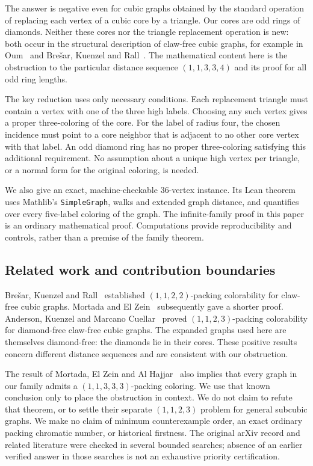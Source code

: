 \documentclass[11pt,a4paper]{article}
\theoremstyle{definition}
\theoremstyle{remark}
\newcommand{\palette}{(1,1,3,3,4)}
\newcommand{\weakpalette}{(1,1,3,3,3)}
\begin{document}
The answer is negative even for cubic graphs obtained by the standard
operation of replacing each vertex of a cubic core by a triangle.
Our cores are odd rings of diamonds. Neither these cores nor the
triangle replacement operation is new: both occur in the structural
description of claw-free cubic graphs, for example in
Oum~\cite{Oum} and Bre\v{s}ar, Kuenzel and Rall~\cite{BKR}.
The mathematical content here is the obstruction to the particular
distance sequence \(\palette\) and its proof for all odd ring lengths.

The key reduction uses only necessary conditions. Each replacement
triangle must contain a vertex with one of the three high labels.
Choosing any such vertex gives a proper three-coloring of the core.
For the label of radius four, the chosen incidence must point to a
core neighbor that is adjacent to no other core vertex with that
label. An odd diamond ring has no proper three-coloring satisfying
this additional requirement. No assumption about a unique high vertex
per triangle, or a normal form for the original coloring, is needed.

We also give an exact, machine-checkable 36-vertex instance. Its Lean
theorem uses Mathlib's \texttt{SimpleGraph}, walks and extended graph
distance, and quantifies over every five-label coloring of the graph.
The infinite-family proof in this paper is an ordinary mathematical
proof. Computations provide reproducibility and controls, rather than
a premise of the family theorem.

\subsection{Related work and contribution boundaries}

Bre\v{s}ar, Kuenzel and Rall~\cite{BKR} established
\((1,1,2,2)\)-packing colorability for claw-free cubic graphs.
Mortada and El Zein~\cite{MEZ} subsequently gave a shorter proof.
Anderson, Kuenzel and Marcano Cuellar~\cite{AKM} proved
\((1,1,2,3)\)-packing colorability for diamond-free claw-free cubic
graphs. The expanded graphs used here are themselves diamond-free:
the diamonds lie in their cores. These positive results concern
different distance sequences and are consistent with our obstruction.

The result of Mortada, El Zein and Al Hajjar~\cite[Theorem~4]{MEAH}
also implies that every graph in our family admits a
\(\weakpalette\)-packing coloring. We use that known conclusion only
to place the obstruction in context. We do not claim to refute that
theorem, or to settle their separate \((1,1,2,3)\) problem for general
subcubic graphs. We make no claim of minimum counterexample order,
an exact ordinary packing chromatic number, or historical firstness.
The original arXiv record and related literature were checked in
several bounded searches; absence of an earlier verified answer in
those searches is not an exhaustive priority certification.
\end{document}
